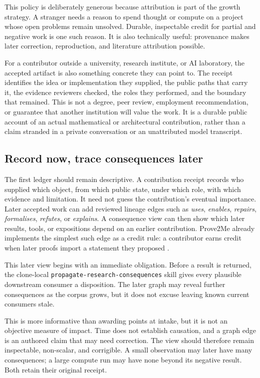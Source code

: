 \documentclass[10pt]{article}
\begin{document}
This policy is deliberately generous because attribution is part of the
growth strategy.  A stranger needs a reason to spend thought or compute on a
project whose open problems remain unsolved.  Durable, inspectable credit for
partial and negative work is one such reason.  It is also technically useful:
provenance makes later correction, reproduction, and literature attribution
possible.

For a contributor outside a university, research institute, or AI laboratory,
the accepted artifact is also something concrete they can point to.  The
receipt identifies the idea or implementation they supplied, the public paths
that carry it, the evidence reviewers checked, the roles they performed, and
the boundary that remained.  This is not a degree, peer review, employment
recommendation, or guarantee that another institution will value the work.
It is a durable public account of an actual mathematical or architectural
contribution, rather than a claim stranded in a private conversation or an
unattributed model transcript.

\subsection*{Record now, trace consequences later}

The first ledger should remain descriptive.  A contribution receipt records
who supplied which object, from which public state, under which role, with
which evidence and limitation.  It need not guess the contribution's eventual
importance.  Later accepted work can add reviewed lineage edges such as
\emph{uses}, \emph{enables}, \emph{repairs}, \emph{formalises}, \emph{refutes},
or \emph{explains}.  A consequence view can then show which later results,
tools, or expositions depend on an earlier contribution.  Prove2Me already
implements the simplest such edge as a credit rule: a contributor earns
credit when later proofs import a statement they proposed \cite{prove2me}.

This later view begins with an immediate obligation. Before a result is
returned, the clone-local \texttt{propagate-research-consequences} skill gives
every plausible downstream consumer a disposition. The later graph may reveal
further consequences as the corpus grows, but it does not excuse leaving known
current consumers stale.

This is more informative than awarding points at intake, but it is not an
objective measure of impact.  Time does not establish causation, and a graph
edge is an authored claim that may need correction.  The view should therefore
remain inspectable, non-scalar, and corrigible.  A small observation may later
have many consequences; a large compute run may have none beyond its negative
result.  Both retain their original receipt.
\end{document}
